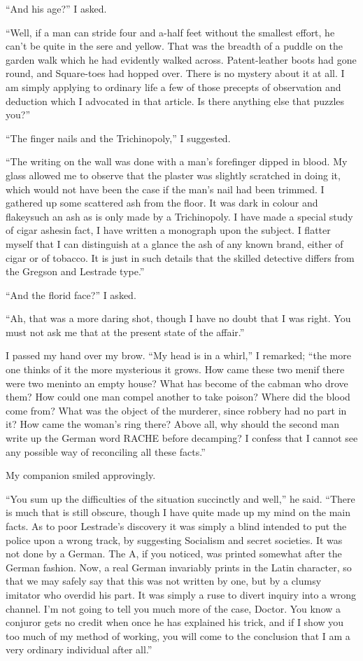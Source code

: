 \documentclass[12pt,english]{book}
\begin{document}
{}``And his age?'' I asked.

{}``Well, if a man can stride four and a-half feet without the smallest
effort, he can't be quite in the sere and yellow. That was the breadth
of a puddle on the garden walk which he had evidently walked across.
Patent-leather boots had gone round, and Square-toes had hopped over.
There is no mystery about it at all. I am simply applying to ordinary
life a few of those precepts of observation and deduction which I
advocated in that article. Is there anything else that puzzles you?''

{}``The finger nails and the Trichinopoly,'' I suggested.

{}``The writing on the wall was done with a man's forefinger dipped
in blood. My glass allowed me to observe that the plaster was slightly
scratched in doing it, which would not have been the case if the man's
nail had been trimmed. I gathered up some scattered ash from the floor.
It was dark in colour and flakey\mdsh{---}such an ash as is only
made by a Trichinopoly. I have made a special study of cigar ashes\mdsh{---}in
fact, I have written a monograph upon the subject. I flatter myself
that I can distinguish at a glance the ash of any known brand, either
of cigar or of tobacco. It is just in such details that the skilled
detective differs from the Gregson and Lestrade type.''

{}``And the florid face?'' I asked.

{}``Ah, that was a more daring shot, though I have no doubt that
I was right. You must not ask me that at the present state of the
affair.''

I passed my hand over my brow. {}``My head is in a whirl,'' I remarked;
{}``the more one thinks of it the more mysterious it grows. How came
these two men\mdsh{---}if there were two men\mdsh{---}into an empty
house? What has become of the cabman who drove them? How could one
man compel another to take poison? Where did the blood come from?
What was the object of the murderer, since robbery had no part in
it? How came the woman's ring there? Above all, why should the second
man write up the German word RACHE before decamping? I confess that
I cannot see any possible way of reconciling all these facts.''

My companion smiled approvingly.

{}``You sum up the difficulties of the situation succinctly and well,''
he said. {}``There is much that is still obscure, though I have quite
made up my mind on the main facts. As to poor Lestrade's discovery
it was simply a blind intended to put the police upon a wrong track,
by suggesting Socialism and secret societies. It was not done by a
German. The A, if you noticed, was printed somewhat after the German
fashion. Now, a real German invariably prints in the Latin character,
so that we may safely say that this was not written by one, but by
a clumsy imitator who overdid his part. It was simply a ruse to divert
inquiry into a wrong channel. I'm not going to tell you much more
of the case, Doctor. You know a conjuror gets no credit when once
he has explained his trick, and if I show you too much of my method
of working, you will come to the conclusion that I am a very ordinary
individual after all.''
\end{document}

